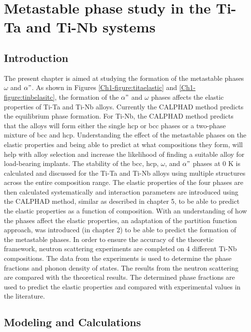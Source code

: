 \chapter{Metastable phase study in the Ti-Ta and Ti-Nb systems}

\section{Introduction}

The present chapter is aimed at studying the formation of the metastable phases $\omega$ and $\alpha"$. As shown in Figures \ref{Ch1-figure:titaelastic} and \ref{Ch1-figure:tinbelasitc}, the formation of the $\alpha"$ and $\omega$ phases affects the elastic properties of Ti-Ta and Ti-Nb alloys. Currently the CALPHAD method predicts the equilibrium phase formation. For Ti-Nb, the CALPHAD method predicts that the alloys will form either the single hcp or bcc phases or a two-phase mixture of bcc and hcp. Understanding the effect of the metastable phases on the elastic properties and being able to predict at what compositions they form, will help with alloy selection and increase the likelihood of finding a suitable alloy for load-bearing implants. The stability of the bcc, hcp, $\omega$, and $\alpha"$ phases at 0 K is calculated and discussed for the Ti-Ta and Ti-Nb alloys using multiple structures across the entire composition range. The elastic properties of the four phases are then calculated systematically and interaction parameters are introduced using the CALPHAD method, similar as described in chapter 5, to be able to predict the elastic properties as a function of composition. With an understanding of how the phases affect the elastic properties, an adaptation of the partition function approach, was introduced (in chapter 2) to be able to predict the formation of the metastable phases. In order to ensure the accuracy of the theoretic framework, neutron scattering experiments are completed on 4 different Ti-Nb compositions. The data from the experiments is used to determine the phase fractions and phonon density of states. The results from the neutron scattering are compared with the theoretical results. The determined phase fractions are used to predict the elastic properties and compared with experimental values in the literature.

\section{Modeling and Calculations}

